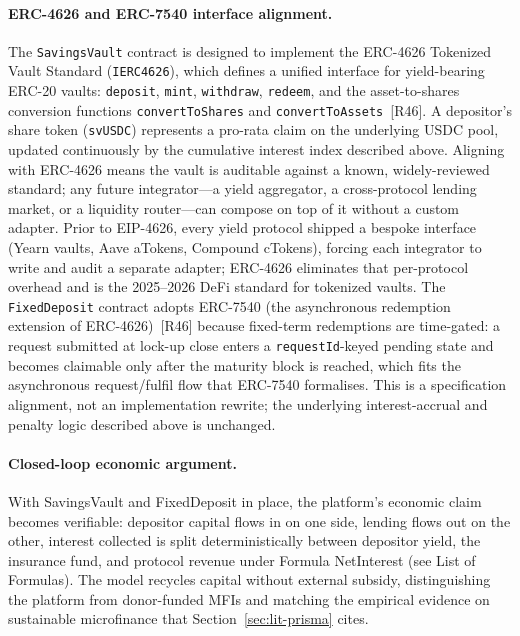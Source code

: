 \documentclass[12pt,a4paper]{report}
\begin{document}
\paragraph{ERC-4626 and ERC-7540 interface alignment.}
The \texttt{SavingsVault} contract is designed to implement the ERC-4626 Tokenized Vault Standard (\texttt{IERC4626}), which defines a unified interface for yield-bearing ERC-20 vaults: \texttt{deposit}, \texttt{mint}, \texttt{withdraw}, \texttt{redeem}, and the asset-to-shares conversion functions \texttt{convertToShares} and \texttt{convertToAssets}~[R46].  A depositor's share token (\texttt{svUSDC}) represents a pro-rata claim on the underlying USDC pool, updated continuously by the cumulative interest index described above.  Aligning with ERC-4626 means the vault is auditable against a known, widely-reviewed standard; any future integrator---a yield aggregator, a cross-protocol lending market, or a liquidity router---can compose on top of it without a custom adapter.  Prior to EIP-4626, every yield protocol shipped a bespoke interface (Yearn vaults, Aave aTokens, Compound cTokens), forcing each integrator to write and audit a separate adapter; ERC-4626 eliminates that per-protocol overhead and is the 2025--2026 DeFi standard for tokenized vaults.  The \texttt{FixedDeposit} contract adopts ERC-7540 (the asynchronous redemption extension of ERC-4626)~[R46] because fixed-term redemptions are time-gated: a request submitted at lock-up close enters a \texttt{requestId}-keyed pending state and becomes claimable only after the maturity block is reached, which fits the asynchronous request/fulfil flow that ERC-7540 formalises.  This is a specification alignment, not an implementation rewrite; the underlying interest-accrual and penalty logic described above is unchanged.

\paragraph{Closed-loop economic argument.}
With SavingsVault and FixedDeposit in place, the platform's economic claim becomes verifiable: depositor capital flows in on one side, lending flows out on the other, interest collected is split deterministically between depositor yield, the insurance fund, and protocol revenue under Formula NetInterest (see List of Formulas). The model recycles capital without external subsidy, distinguishing the platform from donor-funded MFIs and matching the empirical evidence on sustainable microfinance that Section~\ref{sec:lit-prisma} cites.
\end{document}
